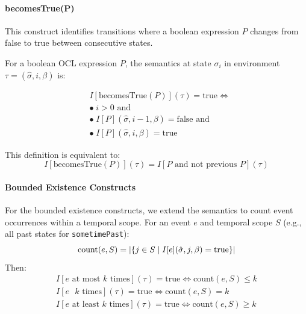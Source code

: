 \paragraph{becomesTrue(P)}
This construct identifies transitions where a boolean expression $P$ changes from 
false to true between consecutive states.

For a boolean OCL expression $P$, the semantics at state $\sigma_i$ in environment 
$\tau = (\hat{\sigma}, i, \beta)$ is:

\begin{equation}
    \begin{split}
    & I[\text{becomesTrue}(P)](\tau) = \text{true} \iff \\
    & \bullet\; i > 0 \text{ and} \\
    & \bullet\; I[P](\hat{\sigma}, i-1, \beta) = \text{false} \text{ and} \\
    & \bullet\; I[P](\hat{\sigma}, i, \beta) = \text{true}
    \end{split}
\end{equation}

This definition is equivalent to:
\begin{equation}
I[\text{becomesTrue}(P)](\tau) = I[P \text{ and not previous } P](\tau)
\end{equation}

\paragraph{Bounded Existence Constructs}
For the bounded existence constructs, we extend the semantics to count event 
occurrences within a temporal scope. For an event $e$ and temporal scope $S$ 
(e.g., all past states for \texttt{sometimePast}):
\begin{equation}
\text{count}(e, S) = |\{j \in S \mid I[e](\hat{\sigma}, j, \beta) = \text{true}\}|
\vspace{-1em}
\end{equation}
Then:
\begin{equation}
\begin{split}
I[e \text{ at most } k \text{ times}](\tau) = \text{true} \iff \text{count}(e, S) \leq k \\
I[e \text{  } k \text{ times}](\tau) = \text{true} \iff \text{count}(e, S) = k \\
I[e \text{ at least } k \text{ times}](\tau) = \text{true} \iff \text{count}(e, S) \geq k
\end{split}
\end{equation}

